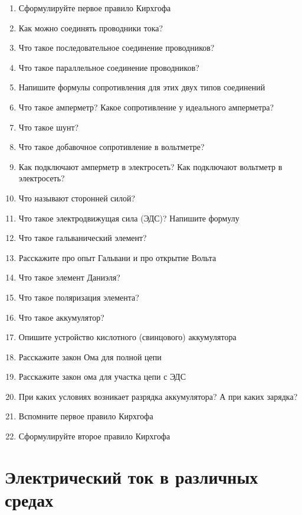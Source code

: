\documentclass[12pt,a4paper]{report}
\begin{document}
\begin{enumerate}
\item Сформулируйте первое правило Кирхгофа
\item Как можно соединять проводники тока?
\item Что такое последовательное соединение проводников?
\item Что такое параллельное соединение проводников?
\item Напишите формулы сопротивления для этих двух типов соединений
\item Что такое амперметр? Какое сопротивление у идеального амперметра?
\item Что такое шунт?
\item Что такое добавочное сопротивление в вольтметре?
\item Как подключают амперметр в электросеть? Как подключают вольтметр в электросеть? 
\item Что называют сторонней силой?
\item Что такое электродвижущая сила (ЭДС)? Напишите формулу
\item Что такое гальванический элемент?
\item Расскажите про опыт Гальвани и про открытие Вольта
\item Что такое элемент Даниэля?
\item Что такое поляризация элемента?
\item Что такое аккумулятор?
\item Опишите устройство кислотного (свинцового) аккумулятора
\item Расскажите закон Ома для полной цепи
\item Расскажите закон ома для участка цепи с ЭДС
\item При каких условиях возникает разрядка аккумулятора? А при каких зарядка?
\item Вспомните первое правило Кирхгофа
\item Сформулируйте второе правило Кирхгофа
\end{enumerate}

\chapter{Электрический ток в различных средах}
\end{document}

